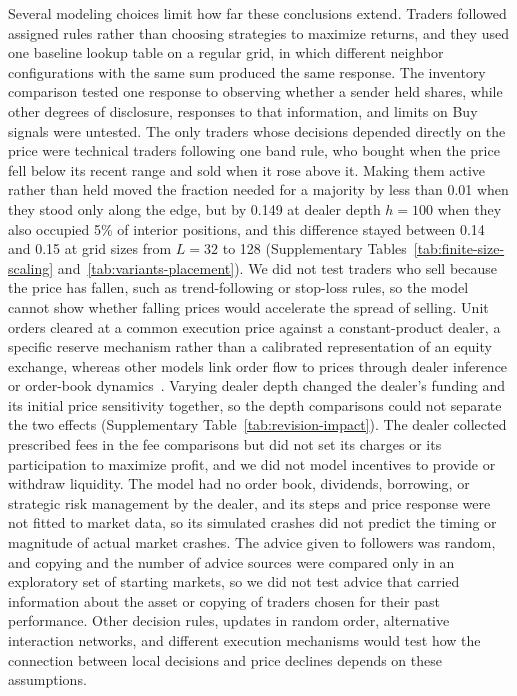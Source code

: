 Several modeling choices limit how far these conclusions extend. Traders
followed assigned rules rather than choosing strategies to maximize
returns, and they used one baseline lookup table on a regular grid, in
which different neighbor configurations with the same sum produced the
same response. The inventory comparison tested one response to observing
whether a sender held shares, while other degrees of disclosure,
responses to that information, and limits on Buy signals were untested.
The only traders whose decisions depended directly on the price were
technical traders following one band rule, who bought when
the price fell below its recent range and sold when it rose above it.
Making them active rather than held moved the fraction needed for a
majority by less than 0.01 when they stood only along the edge, but by
0.149 at dealer depth $h=100$ when they also occupied 5\% of interior
positions, and this difference stayed between 0.14 and 0.15 at grid
sizes from $L=32$ to 128 (Supplementary
Tables~\ref{tab:finite-size-scaling} and~\ref{tab:variants-placement}). We did not test traders who sell
because the price has fallen, such as trend-following or stop-loss
rules, so the model cannot show whether falling prices would accelerate
the spread of selling.
Unit orders cleared at a common execution price against a
constant-product dealer, a specific reserve mechanism rather than a
calibrated representation of an equity exchange, whereas other models
link order flow to prices through dealer inference or order-book
dynamics~\cite{kyle1985continuous,farmer2005predictive,bouchaud2009how}.
Varying dealer depth changed the dealer's funding and its initial price
sensitivity together, so the depth comparisons could not separate the
two effects (Supplementary Table~\ref{tab:revision-impact}). The dealer
collected prescribed fees in the fee comparisons but did not set its
charges or its participation to maximize profit, and we did not model
incentives to provide or withdraw liquidity. The model had no order
book, dividends, borrowing, or strategic risk management by the dealer,
and its steps and price response were not fitted to market data, so its
simulated crashes did not predict the timing or magnitude of actual
market crashes. The advice given to followers was random, and copying
and the number of advice sources were compared only in an exploratory
set of starting markets, so we did not test advice that carried
information about the asset or copying of traders chosen for their past
performance. Other decision rules, updates in random order, alternative
interaction networks, and different execution mechanisms would test how
the connection between local decisions and price declines depends on
these assumptions.
